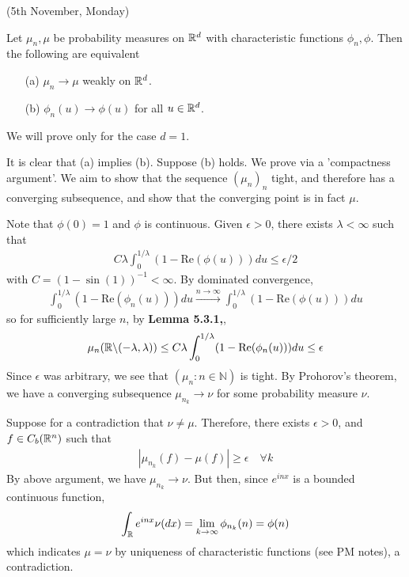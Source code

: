 \documentclass[10pt,a4paper]{report}
\newenvironment{proof}
{\begin{changemargin}{1cm}{0.5cm} 
	}%
	{\end{changemargin}
}
\begin{document}
(5th November, Monday)
\s

 Let $\mu_n, \mu$ be probability measures on $\mathbb{R}^d$ with characteristic functions $\phi_n, \phi$. Then the following are equivalent
\begin{itemize}
\item[(a)] $\mu_n \rightarrow \mu$ weakly on $\mathbb{R}^d$.
\item[(b)] $\phi_n(u) \rightarrow \phi(u)$ for all $u\in \mathbb{R}^d$.
\end{itemize}
We will prove only for the case $d=1$.
\begin{proof}
\pf It is clear that (a) implies (b). Suppose (b) holds. We prove via a 'compactness argument'. We aim to show that the sequence $(\mu_n)_n$ tight, and therefore has a converging subsequence, and show that the converging point is in fact $\mu$.

\quad Note that $\phi(0) = 1$ and $\phi$ is continuous. Given $\epsilon >0$, there exists $\lambda < \infty$ such that
\begin{align*}
C \lambda \int^{1/\lambda}_0 (1- \text{Re}(\phi(u))) du \leq \epsilon/2
\end{align*}
with $C = (1- \sin(1))^{-1} < \infty$. By dominated convergence,
\begin{align*}
\int_0^{1/\lambda} (1- \text{Re}(\phi_n(u))) du \xrightarrow{n\rightarrow \infty} \int^{1/\lambda}_0 (1- \text{Re}(\phi(u))) du
\end{align*}
so for sufficiently large $n$, by \textbf{Lemma 5.3.1,},
\begin{align*}
\mu_n (\mathbb{R} \backslash (-\lambda , \lambda)) \leq C\lambda \int^{1/\lambda}_0 (1- \text{Re}(\phi_n(u))) du \leq \epsilon
\end{align*}
Since $\epsilon$ was arbitrary, we see that $(\mu_n : n\in \mathbb{N})$ is tight. By Prohorov's theorem, we have a converging subsequence $\mu_{n_k} \rightarrow \nu$ for some probability measure $\nu$.

\quad Suppose for a contradiction that $\nu \neq \mu$. Therefore, there exists $\epsilon >0$, and $f\in C_b(\mathbb{R}^n)$ such that
\begin{align*}
|\mu_{n_k} (f) - \mu(f)| \geq \epsilon \quad \forall k
\end{align*}
By above argument, we have $\mu_{n_k} \rightarrow \nu$. But then, since $e^{inx}$ is a bounded continuous function,
\begin{align*}
\int_{\mathbb{R}} e^{inx} \nu(dx) = \lim_{k\rightarrow \infty} \phi_{n_k}(n) = \phi(n)
\end{align*}
which indicates $\mu = \nu$ by uniqueness of characteristic functions (see PM notes), a contradiction.

\eop
\end{proof}
\s
\end{document}
